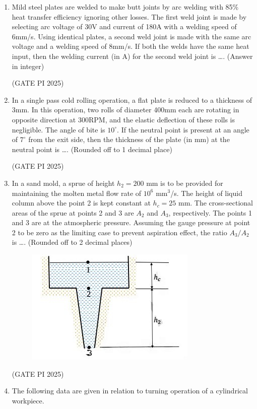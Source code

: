 \documentclass[journal,12pt,onecolumn]{IEEEtran}
\theoremstyle{remark}
\begin{document}
\begin{enumerate}
\item Mild steel plates are welded to make butt joints by arc welding with 85\% heat transfer efficiency ignoring other losses. The first weld joint is made by selecting arc voltage of 30V and current of 180A with a welding speed of 6mm/s. Using identical plates, a second weld joint is made with the same arc voltage and a welding speed of 8mm/s. If both the welds have the same heat input, then the welding current (in A) for the second weld joint is \dots . (Answer in integer)

\hfill (GATE PI 2025)

\item In a single pass cold rolling operation, a flat plate is reduced to a thickness of 3mm. In this operation, two rolls of diameter 400mm each are rotating in opposite direction at 300RPM, and the elastic deflection of these rolls is negligible. The angle of bite is $10^\circ$. If the neutral point is present at an angle of $7^\circ$ from the exit side, then the thickness of the plate (in mm) at the neutral point is \dots . (Rounded off to 1 decimal place)

\hfill (GATE PI 2025)

\item In a sand mold, a sprue of height $h_2 = 200$ mm is to be provided for maintaining the molten metal flow rate of $10^6$ mm$^3$/s. The height of liquid column above the point 2 is kept constant at $h_c = 25$ mm. The cross-sectional areas of the sprue at points 2 and 3 are $A_2$ and $A_3$, respectively. The points 1 and 3 are at the atmospheric pressure. Assuming the gauge pressure at point 2 to be zero as the limiting case to prevent aspiration effect, the ratio $A_3/A_2$ is \dots . (Rounded off to 2 decimal places)

\begin{figure}[H]
\centering
\includegraphics[width=0.5\columnwidth]{fig11.png}
\caption{}
\end{figure}

\hfill (GATE PI 2025)

\item The following data are given in relation to turning operation of a cylindrical workpiece.


\end{enumerate}
\end{document}
